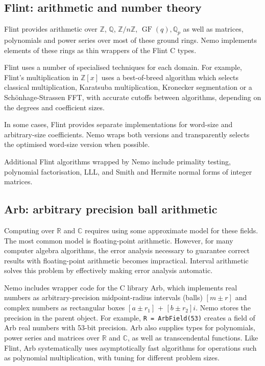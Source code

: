 \documentclass{sig-alternate-05-2015}
\begin{document}
\subsection{Flint: arithmetic and number theory}

Flint provides arithmetic over
$\mathbb{Z}$, $\mathbb{Q}$, $\mathbb{Z}/n\mathbb{Z}$,
$\operatorname{GF}(q), \mathbb{Q}_p$
as well as matrices, polynomials and power series over most
of these ground rings.
Nemo implements elements of these rings as thin wrappers of the
Flint C types.

Flint uses a number of specialised techniques for each domain.
For example, Flint's multiplication in $\mathbb{Z}[x]$
uses a best-of-breed algorithm which selects classical multiplication,
Karatsuba multiplication, Kronecker segmentation or a 
Sch\"{o}nhage-Strassen FFT, with accurate cutoffs
between algorithms, depending on the degrees and coefficient sizes.

In some cases, Flint provides separate implementations
for word-size and arbitrary-size coefficients.
Nemo wraps both versions and transparently selects the
optimised word-size version when possible.

Additional Flint algorithms wrapped by Nemo include
primality testing, polynomial factorisation, LLL, and Smith and Hermite
normal forms of integer matrices.

\subsection{Arb: arbitrary precision ball arithmetic}

Computing over $\mathbb{R}$ and $\mathbb{C}$ requires
using some approximate model for these fields.
The most common model is floating-point arithmetic.
However, for many computer algebra algorithms,
the error analysis necessary to guarantee correct
results with floating-point arithmetic
becomes impractical.
Interval arithmetic solves this problem by effectively making
error analysis automatic.

Nemo includes wrapper code for the C library Arb, which implements real numbers as
arbitrary-precision midpoint-radius intervals (balls) $[m \pm r]$
and complex numbers as rectangular boxes $[a \pm r_1]$ + $[b \pm r_2] i$.
Nemo stores the precision in the parent object.
For example, \texttt{R = ArbField(53)}
creates a field of Arb real numbers with 53-bit precision.
Arb also supplies types for polynomials, power series and matrices
over $\mathbb{R}$ and $\mathbb{C}$, as well as transcendental functions.
Like Flint, Arb systematically uses asymptotically fast algorithms
for operations such as polynomial multiplication, with tuning
for different problem sizes.
\end{document}
